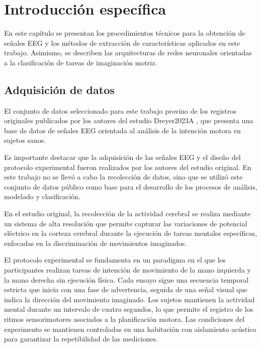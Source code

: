 \chapter{Introducción específica} %

\label{Chapter2}
\label{IntroGeneral}
En este capítulo se presentan los procedimientos técnicos para la obtención de señales EEG y los métodos de extracción de características aplicados en este trabajo. Asimismo, se describen las arquitecturas de redes neuronales orientadas a la clasificación de tareas de imaginación motriz.

\section{Adquisición de datos}

El conjunto de datos seleccionado para este trabajo provino de los registros originales publicados por los autores del estudio Dreyer2023A \cite{dreyer2023large}, que presenta una base de datos de señales EEG orientada al análisis de la intención motora en sujetos sanos.

Es importante destacar que la adquisición de las señales EEG y el diseño del protocolo experimental fueron realizados por los autores del estudio original. En este trabajo no se llevó a cabo la recolección de datos, sino que se utilizó este conjunto de datos público como base para el desarrollo de los procesos de análisis, modelado y clasificación.

En el estudio original, la recolección de la actividad cerebral se realiza mediante un sistema de alta resolución que permite capturar las variaciones de potencial eléctrico en la corteza cerebral durante la ejecución de tareas mentales específicas, enfocadas en la discriminación de movimientos imaginados.

El protocolo experimental se fundamenta en un paradigma en el que los participantes realizan tareas de intención de movimiento de la mano izquierda y la mano derecha sin ejecución física. Cada ensayo sigue una secuencia temporal estricta que inicia con una fase de advertencia, seguida de una señal visual que indica la dirección del movimiento imaginado. Los sujetos mantienen la actividad mental durante un intervalo de cuatro segundos, lo que permite el registro de los ritmos sensorimotores asociados a la planificación motora. Las condiciones del experimento se mantienen controladas en una habitación con aislamiento acústico para garantizar la repetibilidad de las mediciones.

